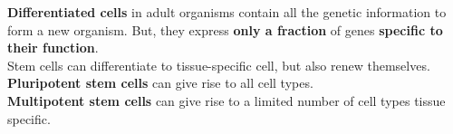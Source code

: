 \textbf{Differentiated cells} in adult organisms contain all the genetic information to form a new organism.
But, they express \textbf{only a fraction} of genes \textbf{specific to their function}.\\

Stem cells can differentiate to tissue-specific cell, but also renew themselves.\\

\textbf{Pluripotent stem cells} can give rise to all cell types.\\
\textbf{Multipotent stem cells} can give rise to a limited number of cell types tissue specific.\\